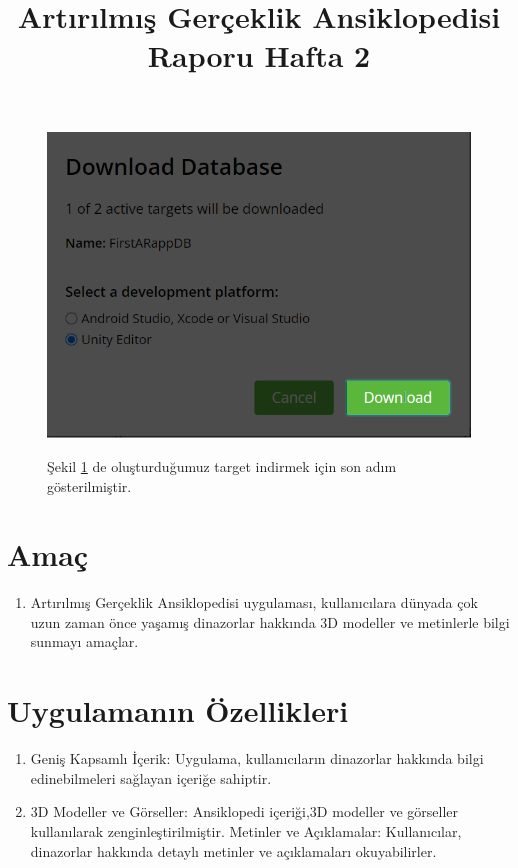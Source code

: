 \documentclass[12pt, a4paper]{article}
\begin{document}
	\newpage
	\begin{figure}[!ht]
		\caption{}
		\centering
		\includegraphics[angle=0, width=\textwidth]{Vuforia15.PNG}
		
		\label{gantt12}
		Şekil \ref{gantt12} de oluşturduğumuz target indirmek için son adım gösterilmiştir.\cite{Vuforia}
	\end{figure}
	\setcounter{section}{0}
	\newpage
		\title{Artırılmış Gerçeklik Ansiklopedisi Raporu Hafta 2}
	\author{}
	\date{}
	\maketitle
	
	\section{Amaç}
	\begin{enumerate}
		\item Artırılmış Gerçeklik Ansiklopedisi uygulaması, kullanıcılara dünyada çok uzun zaman önce yaşamış  dinazorlar hakkında 3D modeller ve metinlerle bilgi sunmayı amaçlar.\cite{Encyclopedia}
	\end{enumerate}
	
	\section{Uygulamanın Özellikleri}
	\begin{enumerate}
		\item Geniş Kapsamlı İçerik: Uygulama, kullanıcıların dinazorlar hakkında bilgi edinebilmeleri sağlayan içeriğe sahiptir.
		\item   3D Modeller ve Görseller: Ansiklopedi içeriği,3D modeller ve görseller kullanılarak zenginleştirilmiştir.
		Metinler ve Açıklamalar: Kullanıcılar, dinazorlar hakkında detaylı metinler ve açıklamaları okuyabilirler.\cite{GitHub}
		
	\end{enumerate}
	
\end{document}
